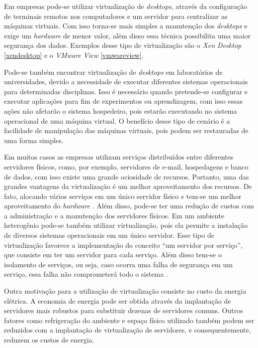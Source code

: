 Em empresas pode-se utilizar virtualização de \textit{desktops}, através da configuração de terminais remotos nos computadores e um servidor 
para centralizar as máquinas virtuais. Com isso torna-se mais simples a manutenção dos \textit{desktops} e exige um \textit{hardware} de 
menor valor, além disso essa técnica possibilita uma maior segurança dos dados. Exemplos desse tipo de virtualização são o \textit{Xen Desktop}
\ref{xendesktop} e o \textit{VMware View} \ref{vmwareview}. 

Pode-se também encontrar virtualização de \textit{desktops} em laboratórios de universidades, devido a necessidade de executar diferentes sistemas 
operacionais para determinadas disciplinas. Isso é necessário quando pretende-se configurar e executar aplicações para fim de experimentos ou
aprendizagem, com isso essas ações não afetarão o sistema hospedeiro, pois estarão executando no sistema operacional de uma máquina virtual. 
O benefício desse tipo de cenário é a facilidade de manipulação das máquinas virtuais, pois podem ser restauradas de uma forma simples.

Em muitos casos as empresas utilizam serviços distribuídos entre diferentes servidores físicos, como, por exemplo, servidores de e-mail, 
hospedagens e banco de dados, com isso existe uma grande ociosidade de recursos. Portanto, uma das grandes vantagens da virtualização é um melhor 
aproveitamento dos recursos. De fato, alocando vários serviços em um único servidor físico e tem-se um melhor aproveitamento do \textit{hardware} 
\cite{moreira2006}. Além disso, pode-se ter uma redução de custos com a administração e a manutenção dos servidores físicos. Em um ambiente 
heterogênio pode-se também utilizar virtualização, pois ela permite a instalação de diversos sistemas operacionais em um único servidor.
Esse tipo de virtualização favorece a implementação do conceito ``um servidor por serviço'', que consiste em ter um servidor para cada 
serviço. Além disso tem-se o isolamento de serviços, ou seja, caso ocorra uma falha de segurança em um serviço, essa falha não comprometerá 
todo o sistema \cite{carissimi2008}.

Outra motivação para a utilização de virtualização consiste no custo da energia elétrica. A economia de energia pode ser obtida 
através da implantação de servidores mais robustos para substituir dezenas de servidores comuns. Outros fatores como refrigeração do ambiente e 
espaço físico utilizado também podem ser reduzidos com a implantação de virtualização de servidores, e consequentemente, reduzem os 
custos de energia.

